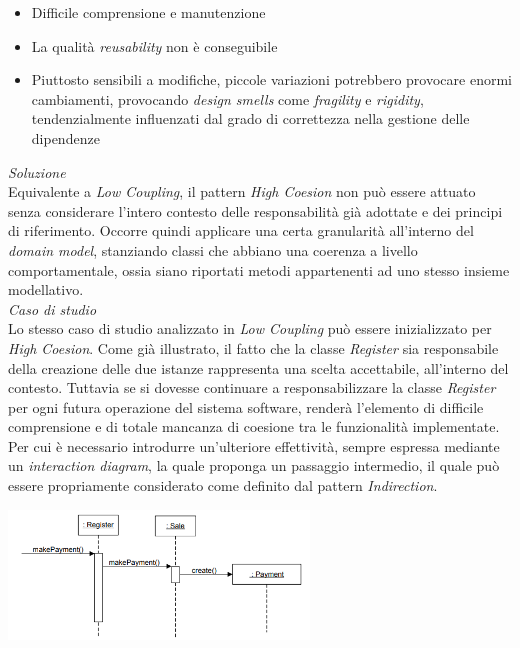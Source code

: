 \documentclass{article}
\begin{document}
\begin{itemize}[label={-}]
    \itemsep0em
    \item Difficile comprensione e manutenzione
    \item La qualità \textit{reusability} non è conseguibile
    \item Piuttosto sensibili a modifiche, piccole variazioni potrebbero provocare enormi cambiamenti, provocando \textit{design smells} come \textit{fragility} e \textit{rigidity}, tendenzialmente influenzati dal grado di correttezza nella gestione delle dipendenze
\end{itemize}\vspace*{7pt}
\textit{Soluzione}\\
Equivalente a \textit{Low Coupling}, il pattern \textit{High Coesion} non può essere attuato senza considerare l'intero contesto delle responsabilità già adottate e dei principi di riferimento. Occorre quindi applicare una certa granularità all'interno del \textit{domain model}, stanziando classi che abbiano una coerenza a livello comportamentale, ossia siano riportati metodi appartenenti ad uno stesso insieme modellativo.\vspace*{14pt}\\
\textit{Caso di studio}\\
Lo stesso caso di studio analizzato in \textit{Low Coupling} può essere inizializzato per \textit{High Coesion}. Come già illustrato, il fatto che la classe \textit{Register} sia responsabile della creazione delle due istanze rappresenta una scelta accettabile, all'interno del contesto. Tuttavia se si dovesse continuare a responsabilizzare la classe \textit{Register} per ogni futura operazione del sistema software, renderà l'elemento di difficile comprensione e di totale mancanza di coesione tra le funzionalità implementate. Per cui è necessario introdurre un'ulteriore effettività, sempre espressa mediante un \textit{interaction diagram}, la quale proponga un passaggio intermedio, il quale può essere propriamente considerato come definito dal pattern \textit{Indirection}.
\begin{center}
    \includegraphics[width=0.6\textwidth]{foto 4.png}
\end{center}
\end{document}
